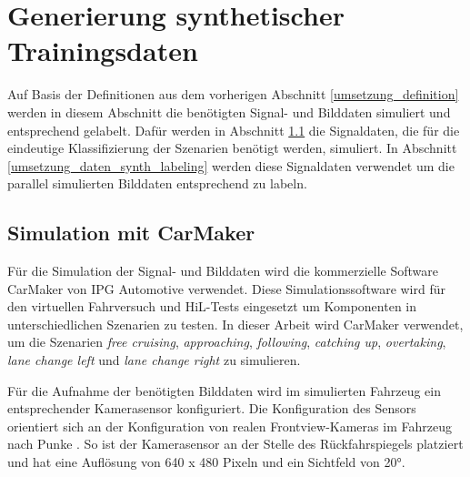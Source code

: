 \section{Generierung synthetischer Trainingsdaten}
\label{umsetzung_daten_synth}

Auf Basis der Definitionen aus dem vorherigen Abschnitt \ref{umsetzung_definition} werden in diesem Abschnitt die benötigten Signal- und Bilddaten simuliert und entsprechend gelabelt. Dafür werden in Abschnitt \ref{umsetzung_daten_synth_simulation} die Signaldaten, die für die eindeutige Klassifizierung der Szenarien benötigt werden, simuliert. In Abschnitt \ref{umsetzung_daten_synth_labeling} werden diese Signaldaten verwendet um die parallel simulierten Bilddaten entsprechend zu labeln.
 
\subsection{Simulation mit CarMaker}
\label{umsetzung_daten_synth_simulation}

Für die Simulation der Signal- und Bilddaten wird die kommerzielle Software CarMaker von IPG Automotive \cite{ipg2018carmaker} verwendet. Diese Simulationssoftware wird für den virtuellen Fahrversuch und \ac{HiL}-Tests eingesetzt um Komponenten in unterschiedlichen Szenarien zu testen. In dieser Arbeit wird CarMaker verwendet, um die Szenarien \textit{free cruising}, \textit{approaching}, \textit{following}, \textit{catching up}, \textit{overtaking}, \textit{lane change left} und \textit{lane change right} zu simulieren.

Für die Aufnahme der benötigten Bilddaten wird im simulierten Fahrzeug ein entsprechender Kamerasensor konfiguriert. Die Konfiguration des Sensors orientiert sich an der Konfiguration von realen Frontview-Kameras im Fahrzeug nach Punke \cite{punke2015kamera}. So ist der Kamerasensor an der Stelle des Rückfahrspiegels platziert und hat eine Auflösung von 640 x 480 Pixeln und ein Sichtfeld von 20°.

